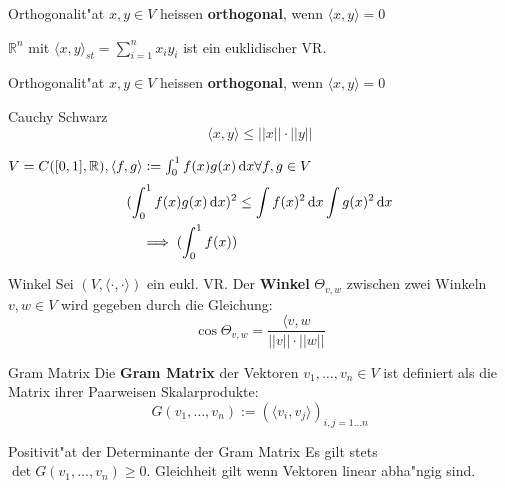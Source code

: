 \documentclass[oneside,fontsize=11pt,paper=a4,BCOR=0mm,DIV=12,automark,headsepline]{scrbook}
\theoremstyle{remark}
\theoremstyle{definition}
\theoremstyle{definition}
\theoremstyle{remark}
\begin{document}
\begin{definition}{Orthogonalit"at}{}
  $x,y\in V$ heissen \textbf{orthogonal}, wenn $\langle x,y\rangle=0$
\end{definition}



\begin{exa}
  \(\mathbb{R}^n\) mit \(\langle x, y\rangle_{st} = \sum_{i=1}^nx_iy_i\) ist ein euklidischer VR.
\end{exa}

\begin{definition}{Orthogonalit"at}{}
  $x,y\in V$ heissen \textbf{orthogonal}, wenn $\langle x,y \rangle=0$
\end{definition}

\begin{satz}{Cauchy Schwarz}{}
  \[\langle x,y \rangle\leq ||x||\cdot ||y||\]
\end{satz}


\begin{exa}
  \(V = C([0, 1], \mathbb{R}), \langle f, g\rangle := \int_0^1f(x)g(x)\dif x \forall f, g \in V\)
  \begin{align*}
    (\int_0^1f(x)g(x)\dif x)^2 &\leq \int f(x)^2\dif x\int g(x)^2\dif x \\
    \implies (\int_0^1 f(x))
  \end{align*}
\end{exa}

\begin{definition}{Winkel}{}
  Sei $(V, \langle {\cdot,\cdot} \rangle)$ ein eukl. VR. Der \textbf{Winkel}
  $\Theta_{v,w}$ zwischen zwei Winkeln $v,w\in V$ wird gegeben durch die Gleichung: \[\cos
    \Theta_{v,w} = \frac{\langle{v,w}}{||v||\cdot ||w||}\]
\end{definition}

\begin{definition}{Gram Matrix}{}
  Die \textbf{Gram Matrix} der Vektoren $v_1, \ldots, v_n \in V$ ist definiert
  als die Matrix ihrer Paarweisen Skalarprodukte:
  \[G(v_1, \ldots, v_n):= (\langle {v_i, v_j} \rangle)_{i,j=1\ldots n}\]
\end{definition}

\begin{satz}{Positivit"at der Determinante der Gram Matrix}
  Es gilt stets $\det G(v_1, \ldots, v_n) \geq 0$. Gleichheit gilt wenn Vektoren
  linear abha"ngig sind.
\end{satz}
\end{document}
